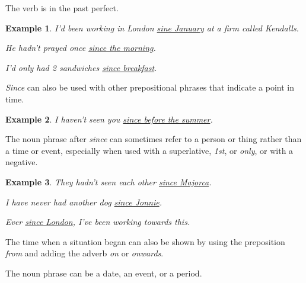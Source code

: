 \documentclass[oneside]{book}
\numberwithin{equation}{section}
\newtheorem{example}{Example}[section]
\begin{document}
The verb is in the past perfect.
\begin{example}
    I'd been working in London \underline{sine January} at a firm called Kendalls.
    
    He hadn't prayed once \underline{since the morning}.
    
    I'd only had 2 sandwiches \underline{since breakfast}.
\end{example}
\textit{Since} can also be used with other prepositional phrases that indicate a point in time.
\begin{example}
    I haven't seen you \underline{since before the summer}.
\end{example}
The noun phrase after \textit{since} can sometimes refer to a person or thing rather than a time or event, especially when used with a superlative, \textit{1st}, or \textit{only}, or with a negative.
\begin{example}
    They hadn't seen each other \underline{since Majorca}.
    
    I have never had another dog \underline{since Jonnie}.
    
    Ever \underline{since London}, I've been working towards this.
\end{example}
%
\noindent{} The time when a situation began can also be shown by using the preposition \textit{from} and adding the adverb \textit{on} or \textit{onwards}.

The noun phrase can be a date, an event, or a period.
\end{document}
